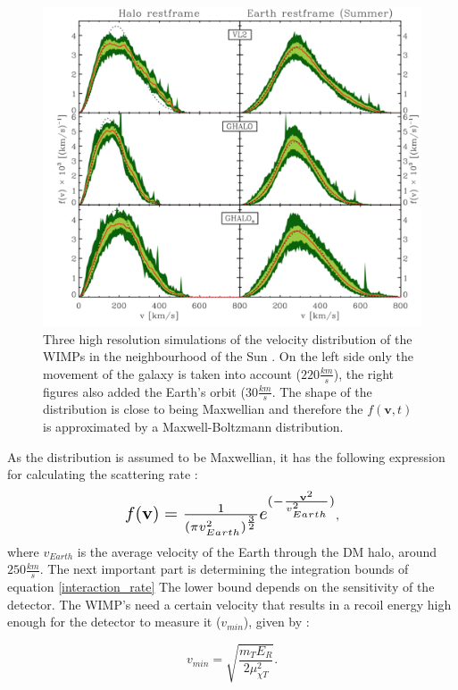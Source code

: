 \documentclass{article}
\begin{document}
\begin{figure}[h]
    \centering
    \includegraphics[width=\textwidth]{Vel-dist.png}
    \caption{Three high resolution simulations of the velocity distribution of the WIMPs in the neighbourhood of the Sun \cite{Kuhlen:2009vh}. On the left side only the movement of the galaxy is taken into account ($220\frac{km}{s}$), the right figures also added the Earth's orbit ($30\frac{km}{s}$. The shape of the distribution is close to being Maxwellian and therefore the $f(\textbf{v},t)$ is approximated by a Maxwell-Boltzmann distribution.}
    \label{Vel dist}
\end{figure}

As the distribution is assumed to be Maxwellian, it has the following expression for calculating the scattering rate \cite{Kavanagh:2014rya}:
\begin{equation}
    \scalebox{1.4}{$f(\textbf{v}) = \frac{1}{(\pi v_{Earth}^{2})^{\frac{3}{2}}}e^{(-\frac{\textbf{v}^{2}}{v_{Earth}^{2}})}$},
\end{equation}
where $v_{Earth}$ is the average velocity of the Earth through the DM halo, around $250\frac{km}{s}$. The next important part is determining the integration bounds of equation \ref{interaction_rate} The lower bound depends on the sensitivity of the detector. The WIMP's need a certain velocity that results in a recoil energy high enough for the detector to measure it ($v_{min}$), given by \cite{Cerdeno:2010jj}:

\begin{equation}
    v_{min} = \sqrt{\frac{m_{T}E_{R}}{2\mu_{\chi T}^{2}}}.
\end{equation}
\end{document}

